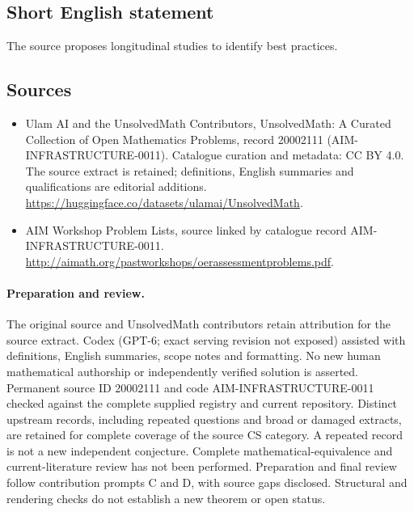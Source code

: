 \documentclass[11pt]{article}
\begin{document}
\subsection{Short English statement}
The source proposes longitudinal studies to identify best practices.
\subsection{Sources}
\begin{itemize}
\item[\hypertarget{source:20002111:1}{S1}] Ulam AI and the UnsolvedMath Contributors, UnsolvedMath: A Curated Collection of Open Mathematics Problems, record 20002111 (AIM-INFRASTRUCTURE-0011). Catalogue curation and metadata: CC BY 4.0. The source extract is retained; definitions, English summaries and qualifications are editorial additions.
\url{https://huggingface.co/datasets/ulamai/UnsolvedMath}.
\item[\hypertarget{source:20002111:2}{S2}] AIM Workshop Problem Lists, source linked by catalogue record AIM-INFRASTRUCTURE-0011.
\url{http://aimath.org/pastworkshops/oerassessmentproblems.pdf}.
\end{itemize}
\paragraph{Preparation and review.}
The original source and UnsolvedMath contributors retain attribution for the source extract. Codex (GPT-6; exact serving revision not exposed) assisted with definitions, English summaries, scope notes and formatting. No new human mathematical authorship or independently verified solution is asserted. Permanent source ID 20002111 and code AIM-INFRASTRUCTURE-0011 checked against the complete supplied registry and current repository. Distinct upstream records, including repeated questions and broad or damaged extracts, are retained for complete coverage of the source CS category. A repeated record is not a new independent conjecture. Complete mathematical-equivalence and current-literature review has not been performed. Preparation and final review follow contribution prompts C and D, with source gaps disclosed. Structural and rendering checks do not establish a new theorem or open status.
\label{end:20002111}
\end{document}
